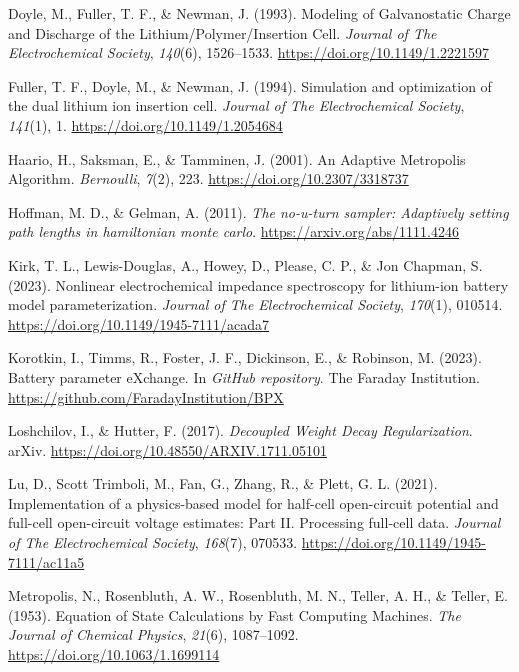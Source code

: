 \documentclass[
]{article}
\newlength{\cslhangindent}
\newenvironment{CSLReferences}[2] %
 {\begin{list}{}{%
  \setlength{\itemindent}{0pt}
  \setlength{\leftmargin}{0pt}
  \setlength{\parsep}{0pt}
  \ifodd #1
   \setlength{\leftmargin}{\cslhangindent}
   \setlength{\itemindent}{-1\cslhangindent}
  \fi
  \setlength{\itemsep}{#2\baselineskip}}}
 {\end{list}}
\begin{document}
\begin{CSLReferences}{1}{0}
Doyle, M., Fuller, T. F., \& Newman, J. (1993). {Modeling of
Galvanostatic Charge and Discharge of the Lithium/Polymer/Insertion
Cell}. \emph{Journal of The Electrochemical Society}, \emph{140}(6),
1526--1533. \url{https://doi.org/10.1149/1.2221597}

Fuller, T. F., Doyle, M., \& Newman, J. (1994). Simulation and
optimization of the dual lithium ion insertion cell. \emph{Journal of
The Electrochemical Society}, \emph{141}(1), 1.
\url{https://doi.org/10.1149/1.2054684}

Haario, H., Saksman, E., \& Tamminen, J. (2001). An {Adaptive}
{Metropolis} {Algorithm}. \emph{Bernoulli}, \emph{7}(2), 223.
\url{https://doi.org/10.2307/3318737}

Hoffman, M. D., \& Gelman, A. (2011). \emph{The no-u-turn sampler:
Adaptively setting path lengths in hamiltonian monte carlo}.
\url{https://arxiv.org/abs/1111.4246}

Kirk, T. L., Lewis-Douglas, A., Howey, D., Please, C. P., \& Jon
Chapman, S. (2023). Nonlinear electrochemical impedance spectroscopy for
lithium-ion battery model parameterization. \emph{Journal of The
Electrochemical Society}, \emph{170}(1), 010514.
\url{https://doi.org/10.1149/1945-7111/acada7}

Korotkin, I., Timms, R., Foster, J. F., Dickinson, E., \& Robinson, M.
(2023). Battery parameter eXchange. In \emph{GitHub repository}. The
Faraday Institution. \url{https://github.com/FaradayInstitution/BPX}

Loshchilov, I., \& Hutter, F. (2017). \emph{Decoupled {Weight} {Decay}
{Regularization}}. arXiv.
\url{https://doi.org/10.48550/ARXIV.1711.05101}

Lu, D., Scott Trimboli, M., Fan, G., Zhang, R., \& Plett, G. L. (2021).
Implementation of a physics-based model for half-cell open-circuit
potential and full-cell open-circuit voltage estimates: {P}art {II}.
Processing full-cell data. \emph{Journal of The Electrochemical
Society}, \emph{168}(7), 070533.
\url{https://doi.org/10.1149/1945-7111/ac11a5}

Metropolis, N., Rosenbluth, A. W., Rosenbluth, M. N., Teller, A. H., \&
Teller, E. (1953). Equation of {State} {Calculations} by {Fast}
{Computing} {Machines}. \emph{The Journal of Chemical Physics},
\emph{21}(6), 1087--1092. \url{https://doi.org/10.1063/1.1699114}


\end{CSLReferences}
\end{document}
